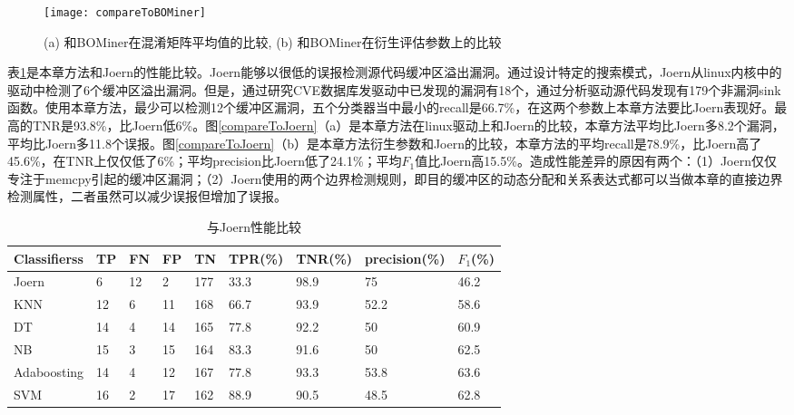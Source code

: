 {\begin{figure}[htb]
\begin{center}
\texttt{[image: compareToBOMiner]}
\end{center}
\caption{(a) 和BOMiner在混淆矩阵平均值的比较, (b) 和BOMiner在衍生评估参数上的比较}
\label{compareToBOMiner}
\end{figure}

表\ref{和Joern的混淆矩阵比较}是本章方法和Joern的性能比较。Joern能够以很低的误报检测源代码缓冲区溢出漏洞。通过设计特定的搜索模式，Joern从linux内核中的驱动中检测了6个缓冲区溢出漏洞。但是，通过研究CVE数据库发驱动中已发现的漏洞有18个，通过分析驱动源代码发现有179个非漏洞sink函数。使用本章方法，最少可以检测12个缓冲区漏洞，五个分类器当中最小的recall是66.7\%，在这两个参数上本章方法要比Joern表现好。最高的TNR是93.8\%，比Joern低6\%。图\ref{compareToJoern}（a）是本章方法在linux驱动上和Joern的比较，本章方法平均比Joern多8.2个漏洞，平均比Joern多11.8个误报。图\ref{compareToJoern}（b）是本章方法衍生参数和Joern的比较，本章方法的平均recall是78.9\%，比Joern高了45.6\%，在TNR上仅仅低了6\%；平均precision比Joern低了24.1\%；平均$F_1$值比Joern高15.5\%。造成性能差异的原因有两个：（1）Joern仅仅专注于memcpy引起的缓冲区漏洞；（2）Joern使用的两个边界检测规则，即目的缓冲区的动态分配和关系表达式都可以当做本章的直接边界检测属性，二者虽然可以减少误报但增加了误报。

\begin{table}[ht]
\begin{center}
\caption{与Joern性能比较} \label{和Joern的混淆矩阵比较}
\begin{small}
\begin{tabular}{lllllllll}
\hline
 {\bf Classifierss}& {\bf TP} & {\bf FN} & {\bf FP} & {\bf TN} & {\bf TPR(\%)} & {\bf TNR(\%)} & {\bf precision(\%)} & {\bf $F_1$(\%)}\\ \hline
Joern & 6 & 12 & 2 & 177 & 33.3 & 98.9 & 75 & 46.2\\ \hline
KNN & 12 & 6 & 11 & 168 & 66.7 & 93.9 & 52.2 & 58.6\\ \hline
DT & 14 & 4 & 14 & 165 & 77.8 & 92.2 & 50 & 60.9\\ \hline
NB & 15 & 3 & 15 & 164 & 83.3 & 91.6 & 50 & 62.5\\ \hline
Adaboosting & 14 & 4 & 12 & 167 & 77.8 & 93.3 & 53.8 & 63.6\\ \hline
SVM & 16 & 2 & 17 & 162 & 88.9 & 90.5 & 48.5 & 62.8\\ \hline
\end{tabular}
\end{small}
\end{center}
\end{table}

}
